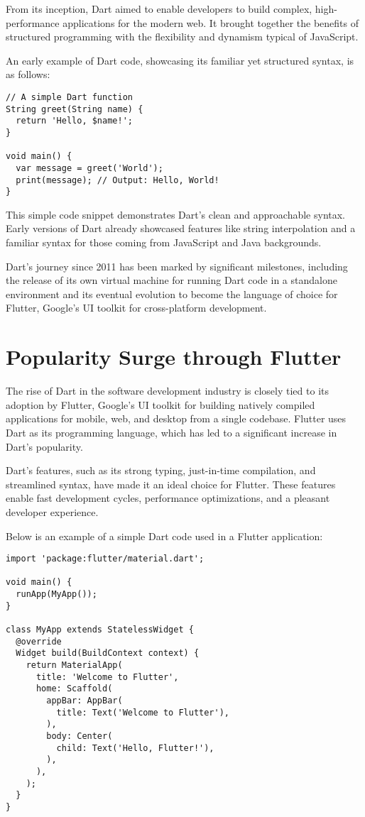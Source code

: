 \documentclass{book}
\begin{document}
From its inception, Dart aimed to enable developers to build complex, high-performance applications for the modern web. It brought together the benefits of structured programming with the flexibility and dynamism typical of JavaScript.

An early example of Dart code, showcasing its familiar yet structured syntax, is as follows:

\begin{lstlisting}[style=dartstyle]
// A simple Dart function
String greet(String name) {
  return 'Hello, $name!';
}

void main() {
  var message = greet('World');
  print(message); // Output: Hello, World!
}
\end{lstlisting}

This simple code snippet demonstrates Dart's clean and approachable syntax. Early versions of Dart already showcased features like string interpolation and a familiar syntax for those coming from JavaScript and Java backgrounds.

Dart's journey since 2011 has been marked by significant milestones, including the release of its own virtual machine for running Dart code in a standalone environment and its eventual evolution to become the language of choice for Flutter, Google's UI toolkit for cross-platform development.



\chapter{Popularity Surge through Flutter}

The rise of Dart in the software development industry is closely tied to its adoption by Flutter, Google's UI toolkit for building natively compiled applications for mobile, web, and desktop from a single codebase. Flutter uses Dart as its programming language, which has led to a significant increase in Dart's popularity.

Dart's features, such as its strong typing, just-in-time compilation, and streamlined syntax, have made it an ideal choice for Flutter. These features enable fast development cycles, performance optimizations, and a pleasant developer experience.

Below is an example of a simple Dart code used in a Flutter application:

\begin{lstlisting}[style=dartstyle]
import 'package:flutter/material.dart';

void main() {
  runApp(MyApp());
}

class MyApp extends StatelessWidget {
  @override
  Widget build(BuildContext context) {
    return MaterialApp(
      title: 'Welcome to Flutter',
      home: Scaffold(
        appBar: AppBar(
          title: Text('Welcome to Flutter'),
        ),
        body: Center(
          child: Text('Hello, Flutter!'),
        ),
      ),
    );
  }
}
\end{lstlisting}
\end{document}
